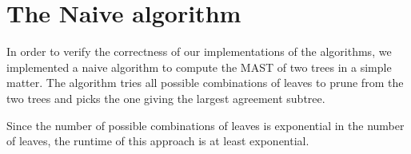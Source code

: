 \chapter{The Naive algorithm}

In order to verify the correctness of our implementations of the algorithms, we implemented a naive algorithm to compute the MAST of two trees in a simple matter. The algorithm tries all possible combinations of leaves to prune from the two trees and picks the one giving the largest agreement subtree.

Since the number of possible combinations of leaves is exponential in the number of leaves, the runtime of this approach is at least exponential.